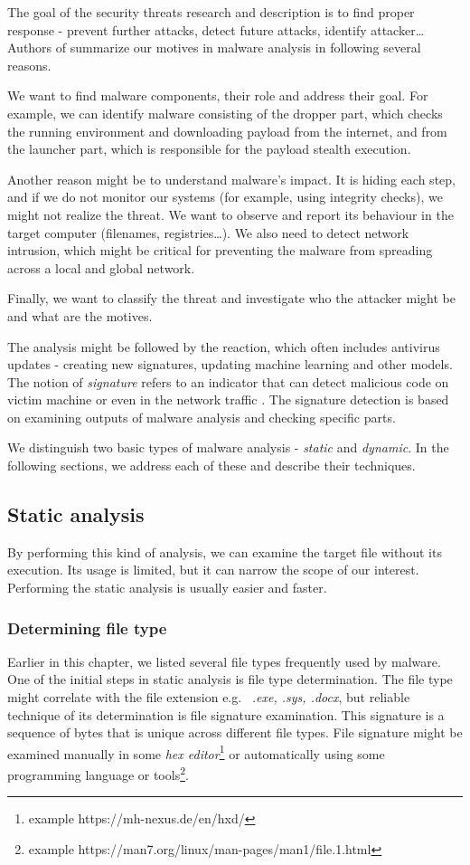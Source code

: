 The goal of the security threats research and description is to find proper response - prevent further attacks, detect future attacks, identify attacker\dots Authors of \cite{KA2018} summarize our motives in malware analysis in following several reasons. 

We want to find malware components, their role and address their goal. For example, we can identify malware consisting of the dropper part, which checks the running environment and downloading payload from the internet, and from the launcher part, which is responsible for the payload stealth execution. 

Another reason might be to understand malware's impact. It is hiding each step, and if we do not monitor our systems (for example, using integrity checks), we might not realize the threat. We want to observe and report its behaviour in the target computer (filenames, registries\dots). We also need to detect network intrusion, which might be critical for preventing the malware from spreading across a local and global network. 

Finally, we want to classify the threat and investigate who the attacker might be and what are the motives.

The analysis might be followed by the reaction, which often includes antivirus updates - creating new signatures, updating machine learning and other models. The notion of \emph{signature} refers to an indicator that can detect malicious code on victim machine or even in the network traffic \cite{Sikorski2012}. The signature detection is based on examining outputs of malware analysis and checking specific parts.

We distinguish two basic types of malware analysis - \emph{static} and \emph{dynamic}. In the following sections, we address each of these and describe their techniques.

\subsection{Static analysis}
By performing this kind of analysis, we can examine the target file without its execution. Its usage is limited, but it can narrow the scope of our interest. \cite{KA2018} Performing the static analysis is usually easier and faster. \cite{Sikorski2012}

\subsubsection{Determining file type}
Earlier in this chapter, we listed several file types frequently used by malware. One of the initial steps in static analysis is file type determination. The file type might correlate with the file extension e.g. \ \emph{.exe, .sys, .docx}, but reliable technique of its determination is file signature examination. This signature is a sequence of bytes that is unique across different file types. File signature might be examined manually in some \emph{hex editor}\footnote{example https://mh-nexus.de/en/hxd/} or automatically using some programming language or tools\footnote{example https://man7.org/linux/man-pages/man1/file.1.html}. \cite{KA2018} 


